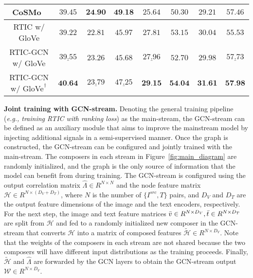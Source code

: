 \documentclass[10pt,twocolumn,letterpaper]{article}
\begin{document}
\begin{table*}[t!]
\begin{adjustbox}{width=1.0\textwidth}
\begin{tabular}{cccccccc}
        CoSMo~\cite{lee2021cosmo} & $ 39.45$ & $ \textbf{24.90} $ & $ \textbf{49.18} $ & $ 25.64 $ & $ 50.30 $ & $ 29.21 $ & $ 57.46 $ \\
        \hline
        RTIC w/ GloVe & $ 39.22 $ & $ 22.81 $ & $ 45.97 $ & $ 27.81 $ & $ 53.15 $ & $ 30.04 $ & $ 55.53 $ \\
        RTIC-GCN w/ GloVe & $ \underline{39.55} $ & $ 23.26 $ & $ 45.68 $ & $ \underline{27.96} $ & $ 52.70 $ & $ 29.98 $ & $ \underline{57.73} $ \\
        RTIC-GCN w/ GloVe$^\textsuperscript{\dag}$ & $ \textbf{40.64} $ & $ \underline{23.79} $ & $ \underline{47.25} $ & $ \textbf{29.15} $ & $ \textbf{54.04} $ & $ \textbf{31.61} $ & $ \textbf{57.98} $ \\
        \bottomrule
    \end{tabular}
    \end{adjustbox}
    \label{tab:bechmark_fashion_iq}
    \end{table*}


\noindent
\textbf{Joint training with GCN-stream.}
Denoting the general training pipeline (\textit{e.g., training RTIC with ranking loss}) as the main-stream, the GCN-stream can be defined as an auxiliary module that aims to improve the mainstream model by injecting additional signals in a semi-supervised manner. Once the graph is constructed, the GCN-stream can be configured and jointly trained with the main-stream. The composers in each stream in Figure~\ref{fig:main_diagram} are randomly initialized, and the graph is the only source of information that the model can benefit from during training. The GCN-stream is configured using the output correlation matrix $\hat{\Lambda} \in R^{N \times N}$ and the node feature matrix $\mathcal{H} \in R^{N \times (D_V + D_T)}$, where $N$ is the number of $\{I^{src}, T\}$ pairs, and $D_V$ and $D_T$ are the output feature dimensions of the image and the text encoders, respectively. For the next step, the image and text feature matrices $\Bar{v} \in R^{N \times D_V}, \Bar{t} \in R^{N \times D_T}$ are split from $\mathcal{H}$ and fed to a randomly initialized new composer in the GCN-stream that converts $\mathcal{H}$ into a matrix of composed features $\tilde{\mathcal{H}} \in R^{N \times D_V}$. Note that the weights of the composers in each stream are not shared because the two composers will have different input distributions as the training proceeds. Finally,  $\tilde{\mathcal{H}}$ and $\hat{\Lambda}$ are forwarded by the GCN layers to obtain the GCN-stream output $\mathcal{W} \in R^{N \times D_V}$.
\end{document}
